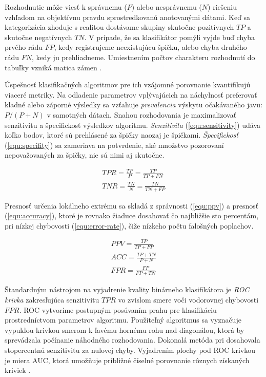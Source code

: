 Rozhodnutie môže viesť k správnemu ($P$) alebo nesprávnemu ($N$) riešeniu vzhľadom na objektívnu pravdu
sprostredkovanú anotovanými dátami. Keď sa kategorizácia zhoduje s realitou dostávame skupiny
skutočne pozitívnych $TP$ a skutočne negatívnych $TN$. V prípade, že sa klasifikátor pomýli vyjde buď chyba
prvého rádu $FP$, kedy registrujeme neexistujúcu špičku, alebo chyba druhého rádu $FN$, kedy ju prehliadneme.
Umiestnením počtov charakteru rozhodnutí do tabuľky vzniká matica zámen \cite{binary-classifier}.

Úspešnosť klasifikačných algoritmov pre ich vzájomné porovnanie kvantifikujú viaceré metriky. Na odladenie parametrov
vplývajúcich na náchylnosť preferovať kladné alebo záporné výsledky sa vzťahuje \emph{prevalencia} výskytu očakávaného
javu: $P / (P+N)$ v samotných dátach. Snahou rozhodovania je maximalizovať senzitivitu a špecifickosť výsledkov algoritmu.
\emph{Senzitivita} (\ref{equ:sensitivity}) udáva koľko bodov, ktoré sú prehlásené za špičky naozaj je špičkami.
\emph{Špecifickosť} (\ref{equ:specifity}) sa zameriava na potvrdenie, aké množstvo pozorovaní nepovažovaných za špičky,
nie sú nimi aj skutočne.
\begin{ceqn}\begin{align}
TPR = \frac{TP}{P} = \frac{TP}{TP + FN} \label{equ:sensitivity} \\
TNR = \frac{TN}{N} = \frac{TN}{TN + FP} \label{equ:specifity}
\end{align}\end{ceqn}

Presnosť určenia lokálneho extrému sa skladá z správnosti (\ref{equ:ppv}) a presnosť (\ref{equ:accuracy}),
ktoré je rovnako žiaduce dosahovať čo najbližšie sto percentám, pri nízkej chybovosti (\ref{equ:error-rate}), čiže
nízkeho počtu falošných poplachov.
\begin{ceqn}\begin{align}
PPV = \frac{TP}{TP + FP} \label{equ:ppv} \\
ACC = \frac{TP + TN}{P + N}\label{equ:accuracy} \\
FPR = \frac{FP}{FP + TN} \label{equ:error-rate}
\end{align}\end{ceqn}


Štandardným nástrojom na vyjadrenie kvality binárneho klasifikátora je \emph{ROC krivka} zakresľujúca
senzitivitu $TPR$ vo zvislom smere voči vodorovnej chybovosti $FPR$. ROC vytvoríme postupným posúvaním prahu
pre klasifikáciu prostredníctvom parametrov algoritmu. Použiteľný algoritmus sa vyznačuje vypuklou krivkou
smerom k ľavému hornému rohu nad diagonálou, ktorá by sprevádzala počínanie náhodného rozhodovania. Dokonalá
metóda pri dosahovala stopercentnú senzitivitu za nulovej chyby. Vyjadrením plochy pod
ROC krivkou je miera AUC, ktorá umožňuje približné číselné porovnanie rôznych získaných kriviek \cite{roc-analysis}.

